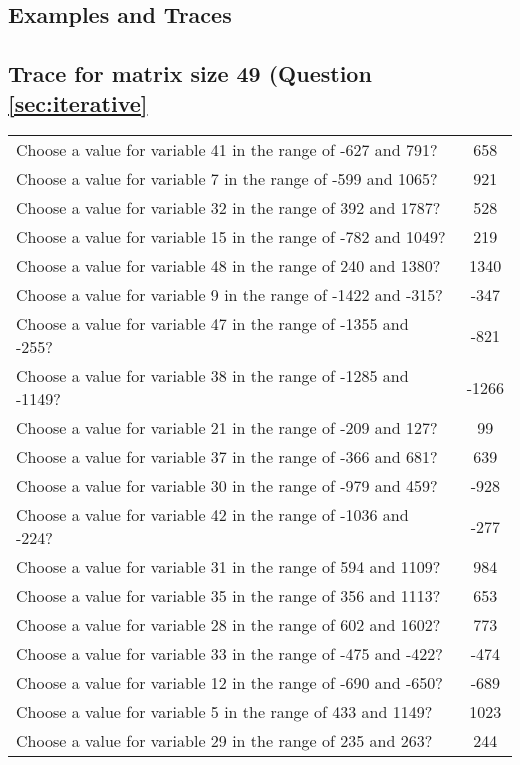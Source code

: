 \documentclass[10pt,a4paper]{article}
\begin{document}
\begin{appendix}\let\cleardoublepage\clearpage

\section{Examples and Traces}
\subsection{Trace for matrix size 49 (Question \ref{sec:iterative}}
\label{sec:app:iterative}
\begin{tabular}{ l  c }
Choose a value for variable 41 in the range of -627 and 791? & 658
\\Choose a value for variable 7 in the range of -599 and 1065? & 921
\\Choose a value for variable 32 in the range of 392 and 1787? & 528
\\Choose a value for variable 15 in the range of -782 and 1049? & 219
\\Choose a value for variable 48 in the range of 240 and 1380? & 1340
\\Choose a value for variable 9 in the range of -1422 and -315? & -347
\\Choose a value for variable 47 in the range of -1355 and -255? & -821
\\Choose a value for variable 38 in the range of -1285 and -1149? & -1266
\\Choose a value for variable 21 in the range of -209 and 127? & 99
\\Choose a value for variable 37 in the range of -366 and 681? & 639
\\Choose a value for variable 30 in the range of -979 and 459? & -928
\\Choose a value for variable 42 in the range of -1036 and -224? & -277
\\Choose a value for variable 31 in the range of 594 and 1109? & 984
\\Choose a value for variable 35 in the range of 356 and 1113? & 653
\\Choose a value for variable 28 in the range of 602 and 1602? & 773
\\Choose a value for variable 33 in the range of -475 and -422? & -474
\\Choose a value for variable 12 in the range of -690 and -650? & -689
\\Choose a value for variable 5 in the range of 433 and 1149? & 1023
\\Choose a value for variable 29 in the range of 235 and 263? & 244

\end{tabular}
\end{appendix}
\end{document}
